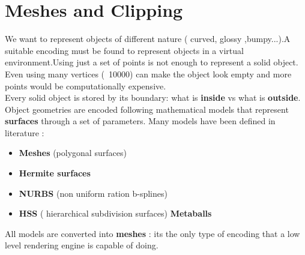 \newpage
\section{Meshes and Clipping}
We want to represent objects of different nature ( curved, glossy ,bumpy...).A suitable encoding must be found to represent objects in a virtual environment.Using just a set of points is not enough to represent a solid object. Even using many vertices (~10000) can make the object look empty and more points would be computationally expensive.\\
Every solid object is stored by its boundary: what is \textbf{inside} vs what is \textbf{outside}.\\
Object geometries are encoded following mathematical models that represent \textbf{surfaces} through a set of parameters. Many models have been defined in literature : 
\begin{itemize}
\item \textbf{Meshes} (polygonal surfaces)
\item \textbf{Hermite surfaces}
\item \textbf{NURBS} (non uniform ration b-splines)
\item \textbf{HSS} ( hierarchical subdivision surfaces)
\textbf{Metaballs}
\end{itemize} 
All models are converted into \textbf{meshes} : its the only type of encoding that a low level rendering engine is capable of doing.\\
